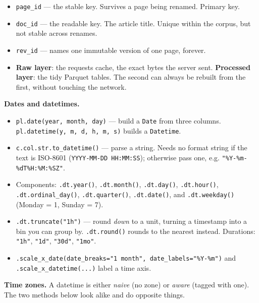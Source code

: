 \documentclass[11pt, a4paper]{article}
\newcommand{\code}[1]{\texttt{#1}}
\begin{document}
\begin{itemize}
  \item \code{page\_id} --- the stable key. Survives a page being renamed. Primary key.
  \item \code{doc\_id} --- the readable key. The article title. Unique within the corpus,
        but not stable across renames.
  \item \code{rev\_id} --- names one immutable version of one page, forever.
  \item \textbf{Raw layer}: the requests cache, the exact bytes the server sent.
        \textbf{Processed layer}: the tidy Parquet tables. The second can always be rebuilt
        from the first, without touching the network.
\end{itemize}

\smallskip

\textbf{Dates and datetimes.}

\begin{itemize}
  \item \code{pl.date(year, month, day)} --- build a \code{Date} from three columns.
        \code{pl.datetime(y, m, d, h, m, s)} builds a \code{Datetime}.
  \item \code{c.col.str.to\_datetime()} --- parse a string. Needs no format string if the
        text is ISO-8601 (\code{YYYY-MM-DD HH:MM:SS}); otherwise pass one, e.g.
        \code{"\%Y-\%m-\%dT\%H:\%M:\%SZ"}.
  \item Components: \code{.dt.year()}, \code{.dt.month()}, \code{.dt.day()},
        \code{.dt.hour()}, \code{.dt.ordinal\_day()}, \code{.dt.quarter()},
        \code{.dt.date()}, and \code{.dt.weekday()} (Monday = 1, Sunday = 7).
  \item \code{.dt.truncate("1h")} --- round \textit{down} to a unit, turning a timestamp into
        a bin you can group by. \code{.dt.round()} rounds to the nearest instead.
        Durations: \code{"1h"}, \code{"1d"}, \code{"30d"}, \code{"1mo"}.
  \item \code{.scale\_x\_date(date\_breaks="1 month", date\_labels="\%Y-\%m")} and
        \code{.scale\_x\_datetime(...)} label a time axis.
\end{itemize}

\smallskip

\textbf{Time zones.}
A datetime is either \textit{naive} (no zone) or \textit{aware} (tagged with one). The two
methods below look alike and do opposite things.
\end{document}
